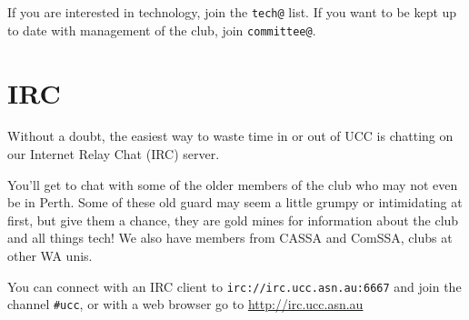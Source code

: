 If you are interested in technology, join the \texttt{tech@} list. If you want to be kept up to date with management of the club, join \texttt{committee@}.



\section{IRC}

Without a doubt, the easiest way to waste time in or out of UCC 
is chatting on our Internet Relay Chat (IRC) server. 

You'll get to chat with some of the older members of the club who 
may not even be in Perth. Some of these old guard may seem a 
little grumpy or intimidating at first, but give them a chance, they 
are gold mines for information about the club and all things tech! 
We also have members from CASSA and ComSSA, clubs at other WA unis. 

You can connect with an IRC client to \texttt{irc://irc.ucc.asn.au:6667} 
and join the channel \texttt{\#ucc}, or with a web browser go to 
\url{http://irc.ucc.asn.au}





